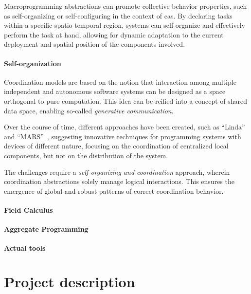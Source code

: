 \documentclass[12pt, a4paper]{article}
\begin{document}
Macroprogramming abstractions can promote collective behavior properties,
such as self-organizing or self-configuring in the context of \ac{cas}.
%
By declaring tasks within a specific spatio-temporal region,
systems can self-organize and effectively perform the task at hand,
allowing for dynamic adaptation to the current deployment and spatial position of the components involved.

\paragraph{Self-organization}
Coordination models are based on the notion that interaction among multiple independent and autonomous software systems
can be designed as a space orthogonal to pure computation.
%
This idea can be reified into a concept of shared data space, enabling so-called \emph{generative communication}.

Over the course of time, different approaches have been created,
such as ``Linda''~\cite{ViroliCoordination2012} and ``MARS''~\cite{mars},
suggesting innovative techniques for programming systems with devices of different nature,
focusing on the coordination of centralized local components,
but not on the distribution of the system.

The challenges require a \emph{self-organizing and coordination} approach,
wherein coordination abstractions solely manage logical interactions.
%
This ensures the emergence of global and robust patterns of correct coordination behavior.

\paragraph{Field Calculus}

\paragraph{Aggregate Programming}

\paragraph{Actual tools}


\section{Project description}\label{sec:project-description}
\end{document}
